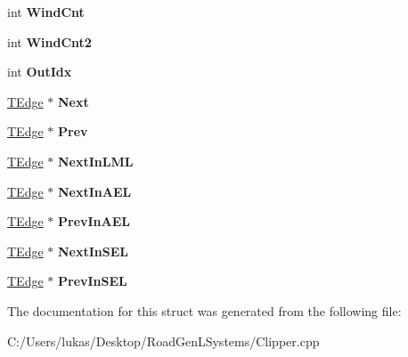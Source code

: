 \begin{DoxyCompactItemize}
\item 
\hypertarget{struct_clipper_lib_1_1_t_edge_ad7df0e20b58e4c6bddcfc7faf0003d4c}{}\label{struct_clipper_lib_1_1_t_edge_ad7df0e20b58e4c6bddcfc7faf0003d4c} 
int {\bfseries Wind\+Cnt}
\item 
\hypertarget{struct_clipper_lib_1_1_t_edge_a50ccbb54513e60a39132dfca7c9b40f4}{}\label{struct_clipper_lib_1_1_t_edge_a50ccbb54513e60a39132dfca7c9b40f4} 
int {\bfseries Wind\+Cnt2}
\item 
\hypertarget{struct_clipper_lib_1_1_t_edge_a85d226803a3c54dbc983668f430b7e28}{}\label{struct_clipper_lib_1_1_t_edge_a85d226803a3c54dbc983668f430b7e28} 
int {\bfseries Out\+Idx}
\item 
\hypertarget{struct_clipper_lib_1_1_t_edge_af63cea19f1590922691d1a3a90e4173d}{}\label{struct_clipper_lib_1_1_t_edge_af63cea19f1590922691d1a3a90e4173d} 
\hyperlink{struct_clipper_lib_1_1_t_edge}{T\+Edge} $\ast$ {\bfseries Next}
\item 
\hypertarget{struct_clipper_lib_1_1_t_edge_a2713de57bcc285aaee2b9e1f5023bebc}{}\label{struct_clipper_lib_1_1_t_edge_a2713de57bcc285aaee2b9e1f5023bebc} 
\hyperlink{struct_clipper_lib_1_1_t_edge}{T\+Edge} $\ast$ {\bfseries Prev}
\item 
\hypertarget{struct_clipper_lib_1_1_t_edge_a1d0ad253e18e6fc82ed025e3d69b33de}{}\label{struct_clipper_lib_1_1_t_edge_a1d0ad253e18e6fc82ed025e3d69b33de} 
\hyperlink{struct_clipper_lib_1_1_t_edge}{T\+Edge} $\ast$ {\bfseries Next\+In\+L\+ML}
\item 
\hypertarget{struct_clipper_lib_1_1_t_edge_a7281f59250f53e96099c1f636350bbd5}{}\label{struct_clipper_lib_1_1_t_edge_a7281f59250f53e96099c1f636350bbd5} 
\hyperlink{struct_clipper_lib_1_1_t_edge}{T\+Edge} $\ast$ {\bfseries Next\+In\+A\+EL}
\item 
\hypertarget{struct_clipper_lib_1_1_t_edge_a69a6d91641e91d87bf8fb658ab5b80d1}{}\label{struct_clipper_lib_1_1_t_edge_a69a6d91641e91d87bf8fb658ab5b80d1} 
\hyperlink{struct_clipper_lib_1_1_t_edge}{T\+Edge} $\ast$ {\bfseries Prev\+In\+A\+EL}
\item 
\hypertarget{struct_clipper_lib_1_1_t_edge_a167cd4d991d27f344d875ad6fd43b862}{}\label{struct_clipper_lib_1_1_t_edge_a167cd4d991d27f344d875ad6fd43b862} 
\hyperlink{struct_clipper_lib_1_1_t_edge}{T\+Edge} $\ast$ {\bfseries Next\+In\+S\+EL}
\item 
\hypertarget{struct_clipper_lib_1_1_t_edge_aa38f572c772d0bae50323f7890334c5f}{}\label{struct_clipper_lib_1_1_t_edge_aa38f572c772d0bae50323f7890334c5f} 
\hyperlink{struct_clipper_lib_1_1_t_edge}{T\+Edge} $\ast$ {\bfseries Prev\+In\+S\+EL}
\end{DoxyCompactItemize}


The documentation for this struct was generated from the following file\+:\begin{DoxyCompactItemize}
\item 
C\+:/\+Users/lukas/\+Desktop/\+Road\+Gen\+L\+Systems/Clipper.\+cpp\end{DoxyCompactItemize}
